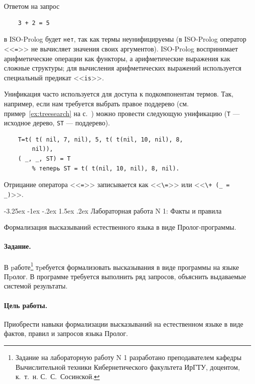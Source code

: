 \documentclass[12pt, openany, twoside]{book} %
\makeatletter
\renewcommand\section{\@startsection {section}{1}{\z@}%
                                   {-3.25ex \@plus -1ex \@minus -.2ex}%
                                   {1.5ex \@plus.2ex}%
                                   {\normalfont\large\bfseries}}
\makeatother
\begin{document}
Ответом на запрос
{\tt\begin{verbatim}
    3 + 2 = 5
\end{verbatim}}
\noindent в ISO-Prolog будет {\tt нет}, так как термы неунифицируемы (в ISO-Prolog оператор <<{\tt =}>> не вычисляет значения своих аргументов). ISO-Prolog воспринимает арифметические операции как функторы, а арифметические выражения как сложные структуры; для вычисления арифметических выражений используется специальный предикат <<{\tt is}>>. %

Унификация часто используется для доступа к подкомпонентам термов. Так, например, если нам требуется выбрать правое поддерево (см. пример~\ref{ex:treesearch} на с.~\pageref{ex:treesearch}) можно провести следующую унификацию ({\tt T} --- исходное дерево, {\tt ST} --- поддерево).
{\tt\begin{verbatim}
    T=t( t( nil, 7, nil), 5, t( t(nil, 10, nil), 8,
        nil)),
    ( _, _, ST) = T
        % теперь ST = t( t(nil, 10, nil), 8, nil).
\end{verbatim}}

Отрицание оператора <<{\tt =}>> записывается как <<{\tt \verb|\=|}>> или <<{\tt \verb|\+| (\_ = \_)}>>.

\section{Лабораторная работа N 1: Факты и правила}

Формализация высказываний естественного языка в виде Про\-лог-прог\-рам\-мы.

\paragraph{Задание.} В pаботе\footnote{Задание на лабораторную работу N 1 разработано преподавателем кафедры Вычислительной техники Кибернетического факультета ИрГТУ, доцентом, к.~т.~н. С.~С.~Сосинской.} тpебуется формализовать высказывания в виде программы на языке Пpолог. В программе требуется выполнить ряд запросов, объяснить выдаваемые системой результаты.

\paragraph{Цель работы.} Приобрести навыки формализации высказываний на естественном языке в виде фактов, правил и запросов языка Пролог.
\end{document}
